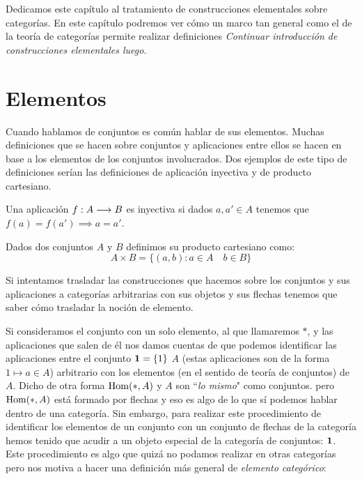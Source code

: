 Dedicamos este capítulo al tratamiento de construcciones elementales
sobre categorías. En este capítulo podremos ver cómo un marco tan general
como el de la teoría de categorías permite realizar definiciones
\textit{Continuar introducción de construcciones elementales luego}.

\section{Elementos}
Cuando hablamos de conjuntos es común hablar de sus elementos. Muchas
definiciones que se hacen sobre conjuntos y aplicaciones entre
ellos se hacen en base a los elementos de los conjuntos involucrados.
Dos ejemplos de este tipo de definiciones serían las definiciones de
aplicación inyectiva y de producto cartesiano.

\begin{definition*}
Una aplicación $f : A\longrightarrow B$ es inyectiva si dados
$a, a' \in A$ tenemos que $f(a) = f(a') \implies a = a'$.
\end{definition*}

\begin{definition*}
Dados dos conjuntos $A$ y $B$ definimos su producto cartesiano
como:
$$A\times B = \{ (a, b) : a \in A \quad b \in B \}$$
\end{definition*}

Si intentamos trasladar las construcciones que hacemos sobre los
conjuntos y sus aplicaciones a categorías arbitrarias con sus objetos
y sus flechas tenemos que saber cómo trasladar la noción de elemento.

Si consideramos el conjunto con un solo elemento, al que llamaremos
$*$, y las aplicaciones que salen de él nos damos cuentas de que podemos
identificar las aplicaciones entre el conjunto $\mathbf{1} = \{ 1 \}$
$A$ (estas aplicaciones son de la forma $1 \mapsto a \in A$)
arbitrario con los elementos (en el sentido de teoría de conjuntos)
de $A$. Dicho de otra forma $\operatorname{Hom}(*, A)$ y $A$ son ``\emph{lo mismo}"  como conjuntos.
pero $\operatorname{Hom}(*, A)$ está formado por flechas y eso es algo de lo que
sí podemos hablar dentro de una categoría. Sin embargo, para realizar
este procedimiento de identificar los elementos de un conjunto con
un conjunto de flechas de la categoría hemos tenido que acudir a un
objeto especial de la categoría de conjuntos: $\mathbf{1}$. Este procedimiento
es algo que quizá no podamos realizar en otras categorías pero nos
motiva a hacer una definición más general de
\textit{elemento categórico}:

